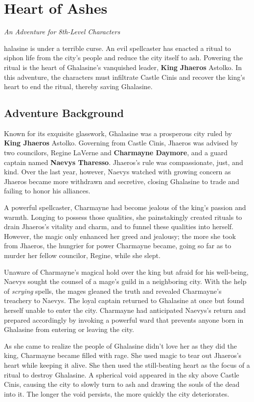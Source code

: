 \documentclass[10pt,a4paper,twoside,bg=print,twocolumn,openany,nodeprecatedcode]{dndbook}
\begin{document}
\chapter{Heart of Ashes}
\textit{An Adventure for 8th-Level Characters}

halasine is under a terrible curse. An evil spellcaster has enacted a ritual to siphon life from the city's people and reduce the city itself to ash. Powering the ritual is the heart of Ghalasine's vanquished leader, \textbf{King Jhaeros} Astolko. In this adventure, the characters must infiltrate Castle Cinis and recover the king's heart to end the ritual, thereby saving Ghalasine.


\section{Adventure Background}
Known for its exquisite glasswork, Ghalasine was a prosperous city ruled by \textbf{King Jhaeros} Astolko. Governing from Castle Cinis, Jhaeros was advised by two councilors, Regine LaVerne and \textbf{Charmayne Daymore}, and a guard captain named \textbf{Naevys Tharesso}. Jhaeros's rule was compassionate, just, and kind. Over the last year, however, Naevys watched with growing concern as Jhaeros became more withdrawn and secretive, closing Ghalasine to trade and failing to honor his alliances.

A powerful spellcaster, Charmayne had become jealous of the king's passion and warmth. Longing to possess those qualities, she painstakingly created rituals to drain Jhaeros's vitality and charm, and to funnel these qualities into herself. However, the magic only enhanced her greed and jealousy; the more she took from Jhaeros, the hungrier for power Charmayne became, going so far as to murder her fellow councilor, Regine, while she slept.

Unaware of Charmayne's magical hold over the king but afraid for his well-being, Naevys sought the counsel of a mage's guild in a neighboring city. With the help of \textit{scrying} spells, the mages gleaned the truth and revealed Charmayne's treachery to Naevys. The loyal captain returned to Ghalasine at once but found herself unable to enter the city. Charmayne had anticipated Naevys's return and prepared accordingly by invoking a powerful ward that prevents anyone born in Ghalasine from entering or leaving the city.

As she came to realize the people of Ghalasine didn't love her as they did the king, Charmayne became filled with rage. She used magic to tear out Jhaeros's heart while keeping it alive. She then used the still-beating heart as the focus of a ritual to destroy Ghalasine. A spherical void appeared in the sky above Castle Cinis, causing the city to slowly turn to ash and drawing the souls of the dead into it. The longer the void persists, the more quickly the city deteriorates.
\end{document}
